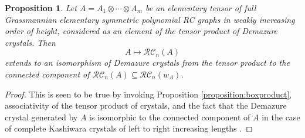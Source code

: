 \documentclass{amsart}
\newtheorem{corollary}[lemma]{Corollary}
\newtheorem{proposition}[lemma]{Proposition}
\theoremstyle{definition}
\theoremstyle{remark}
\numberwithin{equation}{subsection}
\newcommand{\wof}[1]{w_{#1}}
\newcommand{\RC}{\mathcal{RC}}
\newcommand{\maxd}{\mathfrak{m}}
\begin{document}
\begin{proposition}\label{proposition:liftcrystaliso}
Let $A = A_1\otimes\cdots \otimes A_m$ be an elementary tensor of full Grassmannian elementary symmetric polynomial RC graphs in weakly increasing order of height, considered as an element of the tensor product of Demazure crystals. Then 
$$A\mapsto\RC_n(A)$$
extends to an isomorphism of Demazure crystals from the tensor product to the connected component of $\RC_n(A)\subseteq \RC_n(\wof{A})$.
\end{proposition}
\begin{proof}
This is seen to be true by invoking Proposition \ref{proposition:boxproduct}, associativity of the tensor product of crystals, and the fact that the Demazure crystal generated by $A$ is isomorphic to the connected component of $A$ in the case of complete Kashiwara crystals of left to right increasing lengths \cite{kouno2020decomposition}.
\end{proof}

\end{document}
